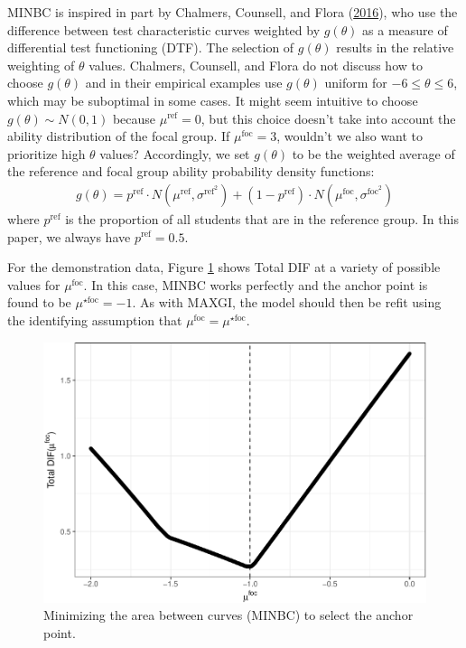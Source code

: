 \documentclass[
  11pt,
]{article}
\begin{document}
MINBC is inspired in part by Chalmers, Counsell, and Flora (\protect\hyperlink{ref-chalmers2016might}{2016}), who use the difference between test characteristic curves weighted by \(g(\theta)\) as a measure of differential test functioning (DTF). The selection of \(g(\theta)\) results in the relative weighting of \(\theta\) values. Chalmers, Counsell, and Flora do not discuss how to choose \(g(\theta)\) and in their empirical examples use \(g(\theta)\) uniform for \(-6 \le \theta \le 6\), which may be suboptimal in some cases. It might seem intuitive to choose \(g(\theta) \sim N(0, 1)\) because \(\mu^\text{ref} = 0\), but this choice doesn't take into account the ability distribution of the focal group. If \(\mu^\text{foc} = 3\), wouldn't we also want to prioritize high \(\theta\) values? Accordingly, we set \(g(\theta)\) to be the weighted average of the reference and focal group ability probability density functions:
\begin{align}
g(\theta) = p^\text{ref} \cdot N(\mu^{\text{ref}}, \sigma^{\text{ref}^2}) + (1 - p^\text{ref}) \cdot N(\mu^{\text{foc}}, \sigma^{\text{foc}^2})
\end{align}
where \(p^\text{ref}\) is the proportion of all students that are in the reference group. In this paper, we always have \(p^\text{ref} = 0.5\).

For the demonstration data, Figure \ref{fig:mabc} shows Total DIF at a variety of possible values for \(\mu^\text{foc}\). In this case, MINBC works perfectly and the anchor point is found to be \(\mu^{\star\text{foc}} = -1\). As with MAXGI, the model should then be refit using the identifying assumption that \(\mu^{\text{foc}} = \mu^{\star\text{foc}}\).

\begin{figure}[H]

{\centering \includegraphics[width=0.7\linewidth]{paper_files/figure-latex/mabc-1} 

}

\caption{Minimizing the area between curves (MINBC) to select the anchor point.}\label{fig:mabc}
\end{figure}
\end{document}
